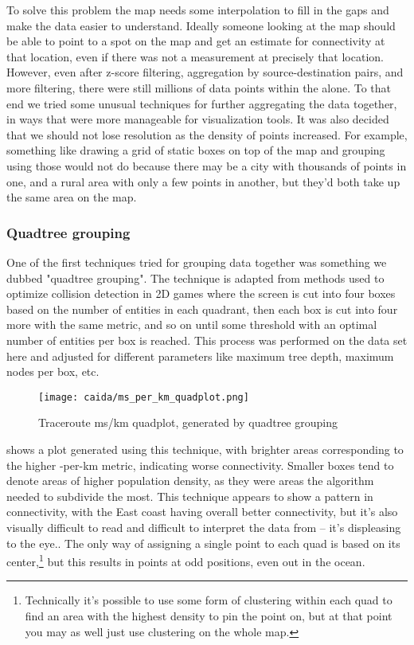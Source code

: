To solve this problem the map needs some interpolation to fill in the gaps and make the data easier to understand. Ideally someone looking at the map should be able to point to a spot on the map and get an estimate for connectivity at that location, even if there was not a measurement at precisely that location. However, even after z-score filtering, aggregation by source-destination pairs, and more filtering, there were still millions of data points within the \us alone. To that end we tried some unusual techniques for further aggregating the data together, in ways that were more manageable for visualization tools. It was also decided that we should not lose resolution as the density of points increased. For example, something like drawing a grid of static boxes on top of the map and grouping using those would not do because there may be a city with thousands of points in one, and a rural area with only a few points in another, but they'd both take up the same area on the map.

\subsubsection{Quadtree grouping} One of the first techniques tried for grouping data together was something we dubbed "quadtree grouping". The technique is adapted from methods used to optimize collision detection in 2D games where the screen is cut into four boxes based on the number of entities in each quadrant, then each box is cut into four more with the same metric, and so on until some threshold with an optimal number of entities per box is reached. This process was performed on the data set here and adjusted for different parameters like maximum tree depth, maximum nodes per box, etc.

\begin{figure}[htb]
    \centering
    \texttt{[image: caida/ms\_per\_km\_quadplot.png]}
    \caption{Traceroute ms/km quadplot, generated by quadtree grouping}
    \label{fig:quadtree_grouping}
\end{figure}

 shows a plot generated using this technique, with brighter areas corresponding to the higher \rtt-per-km metric, indicating worse connectivity. Smaller boxes tend to denote areas of higher population density, as they were areas the algorithm needed to subdivide the most. This technique appears to show a pattern in connectivity, with the East coast having overall better connectivity, but it's also visually difficult to read and difficult to interpret the data from -- it's displeasing to the eye.. The only way of assigning a single point to each quad is based on its center,\footnote{Technically it's possible to use some form of clustering within each quad to find an area with the highest density to pin the point on, but at that point you may as well just use clustering on the whole map.} but this results in points at odd positions, even out in the ocean.

